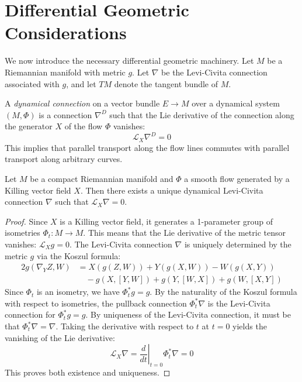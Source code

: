 \section{Differential Geometric Considerations}
\label{sec:diff_geo}

We now introduce the necessary differential geometric machinery. Let $M$ be a Riemannian manifold with metric $g$. Let $\nabla$ be the Levi-Civita connection associated with $g$, and let $TM$ denote the tangent bundle of $M$.

\begin{definition}
A \emph{dynamical connection} on a vector bundle $E \to M$ over a dynamical system $(M, \Phi)$ is a connection $\nabla^D$ such that the Lie derivative of the connection along the generator $X$ of the flow $\Phi$ vanishes:
\[ \mathcal{L}_X \nabla^D = 0 \]
This implies that parallel transport along the flow lines commutes with parallel transport along arbitrary curves.
\end{definition}

\begin{theorem}
\label{thm:inv_conn}
Let $M$ be a compact Riemannian manifold and $\Phi$ a smooth flow generated by a Killing vector field $X$. Then there exists a unique dynamical Levi-Civita connection $\nabla$ such that $\mathcal{L}_X \nabla = 0$.
\end{theorem}

\begin{proof}
Since $X$ is a Killing vector field, it generates a 1-parameter group of isometries $\Phi_t: M \to M$. This means that the Lie derivative of the metric tensor vanishes: $\mathcal{L}_X g = 0$.
The Levi-Civita connection $\nabla$ is uniquely determined by the metric $g$ via the Koszul formula:
\begin{align*}
2 g(\nabla_Y Z, W) &= X(g(Z, W)) + Y(g(X, W)) - W(g(X, Y)) \\
&\quad - g(X, [Y, W]) + g(Y, [W, X]) + g(W, [X, Y])
\end{align*}
Since $\Phi_t$ is an isometry, we have $\Phi_t^* g = g$. By the naturality of the Koszul formula with respect to isometries, the pullback connection $\Phi_t^* \nabla$ is the Levi-Civita connection for $\Phi_t^* g = g$. By uniqueness of the Levi-Civita connection, it must be that $\Phi_t^* \nabla = \nabla$.
Taking the derivative with respect to $t$ at $t=0$ yields the vanishing of the Lie derivative:
\[ \mathcal{L}_X \nabla = \left. \frac{d}{dt} \right|_{t=0} \Phi_t^* \nabla = 0 \]
This proves both existence and uniqueness.
\end{proof}

